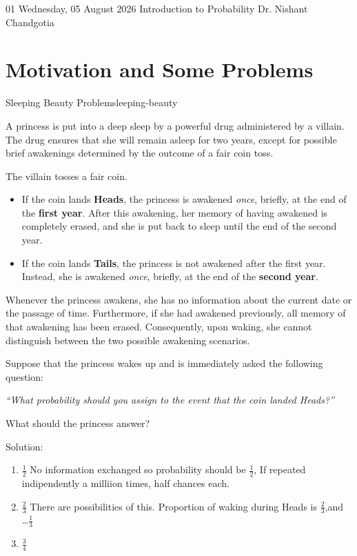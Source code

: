
\lecture
{01}
{Wednesday, 05 August 2026}
{Introduction to Probability}
{Dr. Nishant Chandgotia}

\section{Motivation and Some Problems }

\begin{question}{Sleeping Beauty Problem}{sleeping-beauty}


 
A princess is put into a deep sleep by a powerful drug administered by a villain. The drug ensures that she will remain asleep for two years, except for possible brief awakenings determined by the outcome of a fair coin toss.

The villain tosses a fair coin.

\begin{itemize}
    \item If the coin lands \textbf{Heads}, the princess is awakened \emph{once}, briefly, at the end of the \textbf{first year}. After this awakening, her memory of having awakened is completely erased, and she is put back to sleep until the end of the second year.

    \item If the coin lands \textbf{Tails}, the princess is not awakened after the first year. Instead, she is awakened \emph{once}, briefly, at the end of the \textbf{second year}.
\end{itemize}

Whenever the princess awakens, she has no information about the current date or the passage of time. Furthermore, if she had awakened previously, all memory of that awakening has been erased. Consequently, upon waking, she cannot distinguish between the two possible awakening scenarios.

Suppose that the princess wakes up and is immediately asked the following question:

\begin{center}
    \emph{``What probability should you assign to the event that the coin landed Heads?''}
\end{center}

What should the princess answer?

\end{question}
Solution:
\begin{enumerate}

\item \(\frac{1}{2}\) 
        No information exchanged so probability should be \(\frac{1}{2}\), If repeated indipendently a milliion times, half chances each.

\item \(\frac{2}{3}\) 
        There are possibilities of this. Proportion of waking during Heads is \(\frac{2}{3}\),and \ldots \(\frac{1}{3}\)
\item \(\frac{3}{4}\) 
\end{enumerate}

